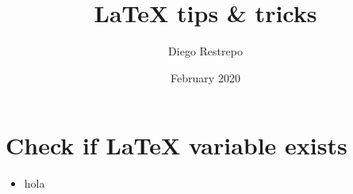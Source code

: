 \documentclass{article}
\title{\LaTeX{} tips \& tricks}
\author{Diego Restrepo}
\date{February 2020}
\begin{document}
\maketitle
\def\proyecto{hola}
\section{Check if \LaTeX{} variable exists }

\begin{itemize}

\begingroup\expandafter\expandafter\expandafter\endgroup
\expandafter\ifx\csname @proyecto\endcsname\relax
\item  \proyecto
\else
\fi
\end{itemize}



\end{document}
